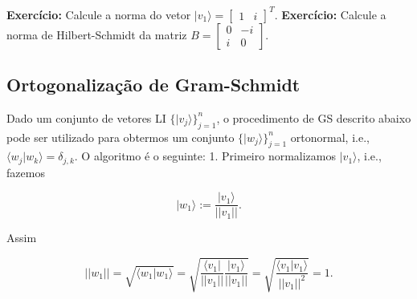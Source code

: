 \documentclass[11pt]{article}
\begin{document}
    \textbf{Exercício:} Calcule a norma do vetor
\(|v_{1}\rangle=\begin{bmatrix} 1 & i \end{bmatrix}^{T}\).
\textbf{Exercício:} Calcule a norma de Hilbert-Schmidt da matriz
\(B=\begin{bmatrix} 0 & -i \\ i & 0 \end{bmatrix}\).

    \subsection{Ortogonalização de
Gram-Schmidt}\label{ortogonalizauxe7uxe3o-de-gram-schmidt}

Dado um conjunto de vetores LI \(\{|v_{j}\rangle\}_{j=1}^{n}\), o
procedimento de GS descrito abaixo pode ser utilizado para obtermos um
conjunto \(\{|w_{j}\rangle\}_{j=1}^{n}\) ortonormal, i.e.,
\(\langle w_{j}|w_{k}\rangle=\delta_{j,k}\). O algoritmo é o seguinte:
1. Primeiro normalizamos \(|v_{1}\rangle\), i.e., fazemos

\begin{equation}
|w_{1}\rangle:=\frac{|v_{1}\rangle}{||v_{1}||}.
\end{equation}

Assim

\begin{equation}
||w_{1}||=\sqrt{\langle w_{1}|w_{1}\rangle} = \sqrt{\frac{\langle v_{1}|}{||v_{1}||}\frac{|v_{1}\rangle}{||v_{1}||}}=\sqrt{\frac{\langle v_{1}|v_{1}\rangle}{||v_{1}||^{2}}}=1.
\end{equation}
\end{document}
